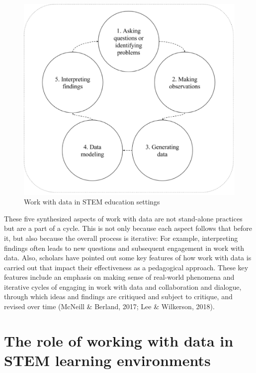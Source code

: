 \documentclass[]{book}
\theoremstyle{definition}
\theoremstyle{definition}
\theoremstyle{definition}
\theoremstyle{remark}
\begin{document}
\begin{figure}

{\centering \includegraphics[width=0.8\linewidth]{images/figure1} 

}

\caption{Work with data in STEM education settings}\label{fig:unnamed-chunk-1}
\end{figure}

These five synthesized aspects of work with data are not stand-alone
practices but are a part of a cycle. This is not only because each
aspect follows that before it, but also because the overall process is
iterative: For example, interpreting findings often leads to new
questions and subsequent engagement in work with data. Also, scholars
have pointed out some key features of how work with data is carried out
that impact their effectiveness as a pedagogical approach. These key
features include an emphasis on making sense of real-world phenomena and
iterative cycles of engaging in work with data and collaboration and
dialogue, through which ideas and findings are critiqued and subject to
critique, and revised over time (McNeill \& Berland, 2017; Lee \&
Wilkerson, 2018).

\section{The role of working with data in STEM learning
environments}\label{the-role-of-working-with-data-in-stem-learning-environments}
\end{document}
